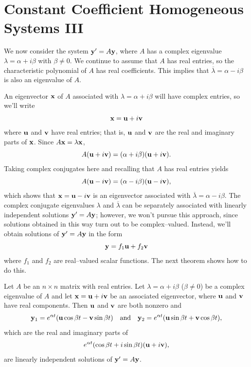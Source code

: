 \section{Constant Coefficient Homogeneous Systems III}

\noindent
We now consider the system ${\bf y}'=A{\bf y}$, where $A$ has a complex eigenvalue
$\lambda=\alpha+i\beta$ with $\beta\ne0$. We continue to assume that $A$ has real entries, so the
characteristic polynomial of $A$ has real coefficients. This implies that
$\overline{\lambda}=\alpha-i\beta$ is also an eigenvalue of $A$.

An eigenvector ${\bf x}$ of $A$ associated with $\lambda=\alpha+i\beta$ will have complex entries,
so we'll write
\[
  {\bf x}={\bf u}+i{\bf v}
\]
where ${\bf u}$ and ${\bf v}$ have real entries; that is, ${\bf u}$ and ${\bf v}$ are the real and
imaginary parts of ${\bf x}$. Since $A{\bf x}=\lambda{\bf x}$,
\begin{equation}
  \label{eq:10.6.1}A({\bf u}+i{\bf v})=(\alpha+i\beta)({\bf u}+i{\bf v}).
\end{equation}
Taking complex conjugates here and recalling that $A$ has real entries yields
\[
  A({\bf u}-i{\bf v})=(\alpha-i\beta)({\bf u}-i{\bf v}),
\]
which shows that ${\bf x}={\bf u}-i{\bf v}$ is an eigenvector associated with
$\overline{\lambda}=\alpha-i\beta$. The complex conjugate eigenvalues $\lambda$ and
$\overline{\lambda}$ can be separately associated with linearly independent solutions
${\bf y}'=A{\bf y}$; however, we won't pursue this approach, since solutions obtained in this way
turn out to be complex--valued. Instead, we'll obtain solutions of ${\bf y}'=A{\bf y}$ in the form
\begin{equation}
  \label{eq:10.6.2}{\bf y}=f_{1}{\bf u}+f_{2}{\bf v}
\end{equation}
where $f_{1}$ and $f_{2}$ are real--valued scalar functions. The next theorem shows how to do this.

\begin{theorem}
  \color{blue}
  \label{thmtype:10.6.1} Let $A$ be an $n\times n$ matrix with real entries. Let
  $\lambda=\alpha+i\beta$ {\rm(}$\beta\ne0${\rm}) be a complex eigenvalue of $A$ and let
  ${\bf x}={\bf u}+i{\bf v}$ be an associated eigenvector, where ${\bf u}$ and ${\bf v}$ have real
  components. Then ${\bf u}$ and ${\bf v}$ are both nonzero and
  \[
    {\bf y}_{1}=e^{\alpha t}({\bf u}\cos\beta t-{\bf v}\sin\beta t) \mbox{\quad and\quad}{\bf y}_{2}=e^{\alpha t}({\bf u}\sin\beta t+{\bf v}\cos\beta t),
  \]
  which are the real and imaginary parts of
  \begin{equation}
    \label{eq:10.6.3}e^{\alpha t}(\cos\beta t+i\sin\beta t)({\bf u}+i{\bf v}),
  \end{equation}
  are linearly independent solutions of ${\bf y}'=A{\bf y}$.
\end{theorem}


